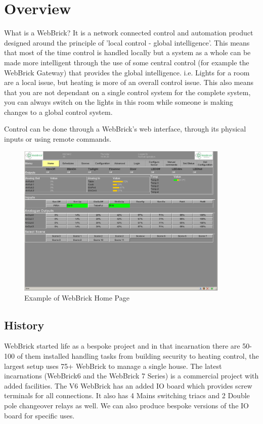 \section{Overview}

What is a WebBrick? It is a network connected control and automation product designed around the principle 
of 'local control - global intelligence'. This means that most of the time control is handled locally but a 
system as a whole can be made more intelligent through the use of some central control
(for example the WebBrick Gateway) that provides the global intelligence. i.e. Lights for a room are a local issue, 
but heating is more of an overall control issue. This also means that you are
not dependant on a single control system for the complete system, you can always switch on the lights 
in this room while someone is making changes to a global control system.

Control can be done through a WebBrick's web interface, through its physical inputs or using remote commands.

\begin{figure}[H]
\centering
\includegraphics[width=0.9\textwidth]{Images/home.png}
\caption{Example of WebBrick Home Page}
\end{figure}
\subsection {History}


WebBrick started life as a bespoke project and in that incarnation there are 50-100 of them installed handling
tasks from building security to heating control, the largest setup uses 75+ WebBrick to manage a single house.
The latest incarnations (WebBrick6 and the WebBrick 7 Series) is a commercial project with added facilities.
The V6 WebBrick has an added IO board which provides screw terminals for all connections. It also has 4 Mains switching 
triacs and 2 Double pole changeover relays as well. We can also produce bespoke versions of the IO board
for specific uses.


